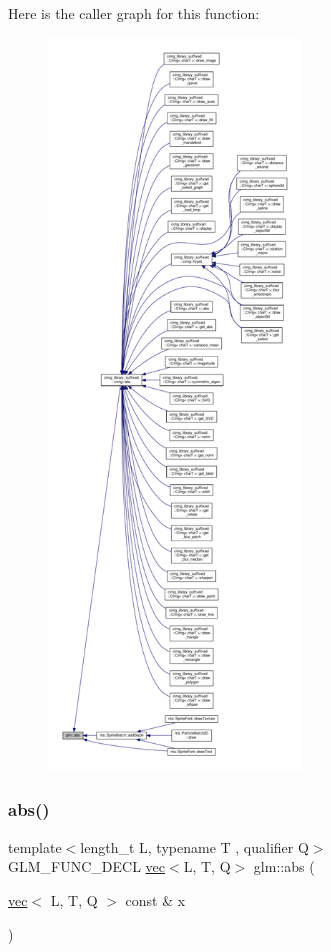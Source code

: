 Here is the caller graph for this function\+:
\nopagebreak
\begin{figure}[H]
\begin{center}
\leavevmode
\includegraphics[height=550pt]{d0/de3/group__core__func__common_ga693d77696ff36572a0da79efec965acd_icgraph}
\end{center}
\end{figure}
\mbox{\label{group__core__func__common_ga3e141c9738c73d3e581efa471dba8b4c}} 
\subsubsection{\texorpdfstring{abs()}{abs()}\hspace{0.1cm}{\footnotesize\ttfamily [2/2]}}
{\footnotesize\ttfamily template$<$length\+\_\+t L, typename T , qualifier Q$>$ \\
G\+L\+M\+\_\+\+F\+U\+N\+C\+\_\+\+D\+E\+CL \hyperlink{structglm_1_1vec}{vec}$<$L, T, Q$>$ glm\+::abs (\begin{DoxyParamCaption}\item[{\hyperlink{structglm_1_1vec}{vec}$<$ L, T, Q $>$ const \&}]{x }\end{DoxyParamCaption})}



